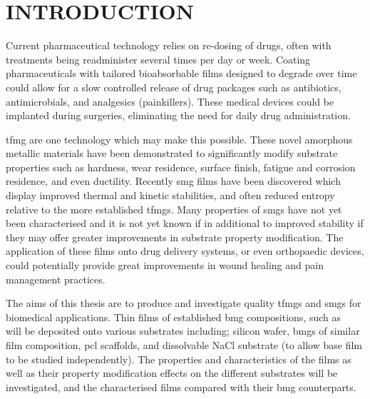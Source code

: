 \documentclass[a4paper,12pt,oneside]{report}%
\begin{document}

\newpage
\tableofcontents\newpage
{}
\listoffigures\newpage
\listoftables\newpage
\clearpage %



\chapter{INTRODUCTION}
\glsresetall
{}
Current pharmaceutical technology relies on re-dosing of drugs, often with treatments being readminister several times per day or week. Coating pharmaceuticals with tailored bioabsorbable films designed to degrade over time could allow for a slow controlled release of drug packages such as antibiotics, antimicrobials, and analgesics (painkillers). These medical devices could be implanted during surgeries, eliminating the need for daily drug administration. 

\Gls{tfmg} are one technology which may make this possible. These novel amorphous metallic materials have been demonstrated to significantly modify substrate properties such as hardness, wear residence, surface finish, fatigue and corrosion residence, and even ductility. Recently \gls{smg} films have been discovered which display improved thermal and kinetic stabilities, and often reduced entropy relative to the more established \gls{tfmg}s. Many properties of \gls{smg}s have not yet been characterised and it is not yet known if in additional to improved stability if they may offer greater improvements in substrate property modification. The application of these films onto drug delivery systems, or even orthopaedic devices, could potentially provide great improvements in wound healing and pain management practices.

The aims of this thesis are to produce and investigate quality \gls{tfmg}s and \gls{smg}s for biomedical applications. Thin films of established \gls{bmg} compositions, such as \MgZnCa~ will be deposited onto various substrates including; silicon wafer, \gls{bmg}s of similar film composition, \Gls{pcl} scaffolds, and dissolvable NaCl substrate (to allow base film to be studied independently). The properties and characteristics of the films as well as their property modification effects on the different substrates will be investigated, and the characterised films compared with their \gls{bmg} counterparts. 
\end{document}
